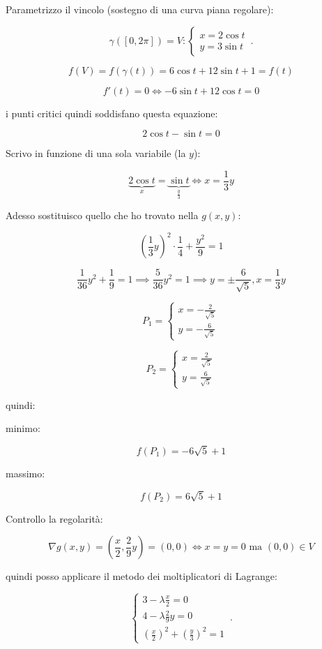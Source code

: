\documentclass[../appunti-analisi.tex]{subfiles}
\begin{document}
Parametrizzo il vincolo (sostegno di una curva piana regolare):

\[
    \gamma([0,2\pi])=V: \begin{cases}
               x = 2 \cos t\\
               y = 3 \sin t
        \end{cases}\,.
\]

\[
    f(V) = f(\gamma(t)) = 6 \cos t + 12 \sin t + 1 = f(t)
\]

\[
    f'(t) = 0 \Leftrightarrow -6 \sin t + 12 \cos t = 0
\]

i punti critici quindi soddisfano questa equazione:

\[
    2 \cos t - \sin t = 0
\]

Scrivo in funzione di una sola variabile (la $y$):

\[
 \underbrace{2 \cos t}_\text{$x$} = \underbrace{\sin t}_\text{$\frac{y}{3}$}    \Leftrightarrow  x = \frac{1}{3}y
\]

Adesso sostituisco quello che ho trovato nella $g(x,y)$:

\[
    ( \frac{1}{3}y)^{2} \cdot \frac{1}{4} + \frac{y^{2} }{9} = 1
\]

\[
   \frac{1}{36} y ^{2} + \frac{1}{9} = 1  \implies \frac{5}{36} y^{2} = 1 \implies y = \pm \frac{6}{\sqrt{5}}, x = \frac{1}{3}y
\]

\[
   P_1=\begin{cases}
       x= - \frac{2}{\sqrt{5}}\\
        y = -\frac{6}{\sqrt{5}}
   \end{cases} 
\]

\[
   P_2=\begin{cases}
       x=  \frac{2}{\sqrt{5}}\\
        y = \frac{6}{\sqrt{5}}
   \end{cases} 
\]

quindi:

minimo:

\[
    f(P_1) = -6 \sqrt{5} + 1 
\]

massimo:

\[
    f(P_2) = 6 \sqrt{5} + 1
\]

Controllo la regolarità:

\[
    \nabla g(x,y) = ( \frac{x}{2}, \frac{2}{9}y) = (0,0) \Leftrightarrow x=y = 0 \text{ ma } (0,0) \in V
\]

quindi posso applicare il metodo dei moltiplicatori di Lagrange:

\[
        \begin{cases}
               3- \lambda \frac{x}{2} = 0\\
               4 - \lambda \frac{2}{9} y = 0\\
               (\frac{x}{2})^{2}+(\frac{y}{3})^{2}=1
        \end{cases}\,.
\]
\end{document}
